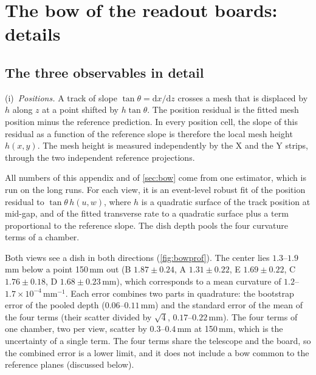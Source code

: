\section{The bow of the readout boards: details}\label{app:bow}

\subsection{The three observables in detail}
(i)~\emph{Positions.} A track of slope $\tan\theta = \mathrm{d}x/\mathrm{d}z$ crosses a mesh that is displaced by $h$
along $z$ at a point shifted by $h\tan\theta$. The position residual is the fitted mesh position minus the reference
prediction. In every position cell, the slope of this residual as a function of the reference slope is therefore the
local mesh height $h(x,y)$. The mesh height is measured independently by the X and the Y strips, through the two
independent reference projections.

All numbers of this appendix and of \cref{sec:bow} come from one estimator, which is run on the long runs. For each
view, it is an event-level robust fit of the position residual to $\tan\theta\,h(u,w)$, where $h$ is a quadratic
surface of the track position at mid-gap, and of the fitted transverse rate to a quadratic surface plus a term
proportional to the reference slope. The dish depth pools the four curvature terms of a chamber.

Both views see a dish in both directions (\cref{fig:bowprof}). The center lies $1.3$--$1.9$\,mm below a point 150\,mm
out (B $1.87\pm0.24$, A $1.31\pm0.22$, E $1.69\pm0.22$, C $1.76\pm0.18$, D $1.68\pm0.23$\,mm), which corresponds to a
mean curvature of $1.2$--$1.7\times10^{-4}$\,mm$^{-1}$. Each error combines two parts in quadrature: the bootstrap
error of the pooled depth ($0.06$--$0.11$\,mm) and the standard error of the mean of the four terms (their scatter
divided by $\sqrt4$, $0.17$--$0.22$\,mm). The four terms of one chamber, two per view, scatter by $0.3$--$0.4$\,mm at
150\,mm, which is the uncertainty of a single term. The four terms share the telescope and the board, so the combined
error is a lower limit, and it does not include a bow common to the reference planes (discussed below).

